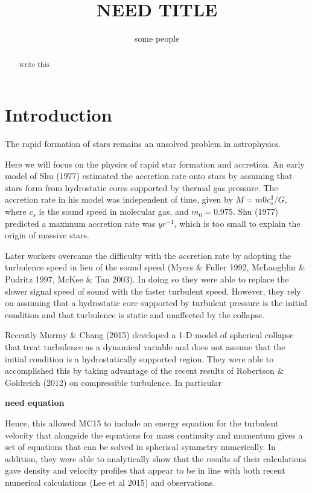 \documentclass{emulateapj}
\begin{document}
\title{NEED TITLE}

\author{some people}


\begin{abstract}

write this

\end{abstract}


\section{Introduction}

The rapid formation of stars remains an unsolved problem in astrophysics.

Here we will focus on the physics of rapid star formation and accretion.  An early model of Shu (1977) estimated the accretion rate onto stars by 
assuming that stars form from hydrostatic cores
supported by thermal gas pressure. The accretion
rate in his model was independent of time, given
by $M = m0c_s^3/G$, where $c_s$  is the
sound speed in molecular gas, and $m_0 = 0.975$.
Shu (1977) predicted a maximum accretion rate was $yr^{-1}$, which is too small to explain
the origin of massive stars.

Later workers overcame the difficulty with the accretion rate by adopting the turbulence speed in lieu of the sound speed (Myers \& Fuller 1992, McLaughlin \& Pudritz 1997, McKee \& Tan 2003). In doing so they were able to replace the slower signal speed of sound with the faster turbulent speed.  However, they rely on assuming that a hydrostatic core supported by turbulent pressure is the initial condition and that turbulence is static and unaffected by the collapse.  

Recently Murray \& Chang (2015) developed a 1-D model of spherical collapse that treat turbulence as a dynamical variable and does not assume that the initial condition is a hydrostatically supported region.  They were able to accomplished this by taking advantage of the recent results of Robertson \& Goldreich (2012) on compressible turbulence.   In particular 

{\bf need equation}

Hence, this allowed MC15 to include an energy equation for the turbulent velocity that alongside the equations for mass continuity and momentum gives a set of equations that can be solved in spherical symmetry numerically.  In addition, they were able to analytically show that the results of their calculations gave density and velocity profiles that appear to be in line with both recent numerical calculations (Lee et al 2015) and observations.    
\end{document}
